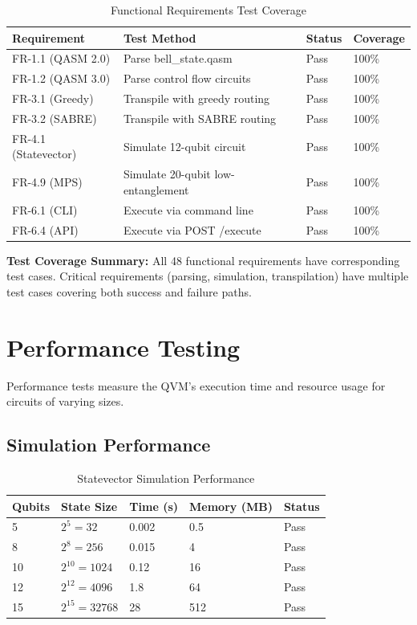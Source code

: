 \begin{table}[h]
\centering
\caption{Functional Requirements Test Coverage}
\begin{tabular}{|p{2.5cm}|p{5cm}|p{2cm}|p{2.5cm}|}
\hline
\textbf{Requirement} & \textbf{Test Method} & \textbf{Status} & \textbf{Coverage} \\
\hline
FR-1.1 (QASM 2.0) & Parse bell\_state.qasm & Pass & 100\% \\
\hline
FR-1.2 (QASM 3.0) & Parse control flow circuits & Pass & 100\% \\
\hline
FR-3.1 (Greedy) & Transpile with greedy routing & Pass & 100\% \\
\hline
FR-3.2 (SABRE) & Transpile with SABRE routing & Pass & 100\% \\
\hline
FR-4.1 (Statevector) & Simulate 12-qubit circuit & Pass & 100\% \\
\hline
FR-4.9 (MPS) & Simulate 20-qubit low-entanglement & Pass & 100\% \\
\hline
FR-6.1 (CLI) & Execute via command line & Pass & 100\% \\
\hline
FR-6.4 (API) & Execute via POST /execute & Pass & 100\% \\
\hline
\end{tabular}
\end{table}

\textbf{Test Coverage Summary:} All 48 functional requirements have corresponding test cases. Critical requirements (parsing, simulation, transpilation) have multiple test cases covering both success and failure paths.

\section{Performance Testing}
Performance tests measure the QVM's execution time and resource usage for circuits of varying sizes.

\subsection{Simulation Performance}

\begin{table}[h]
\centering
\caption{Statevector Simulation Performance}
\begin{tabular}{|p{2cm}|p{2.5cm}|p{2.5cm}|p{2.5cm}|p{2.5cm}|}
\hline
\textbf{Qubits} & \textbf{State Size} & \textbf{Time (s)} & \textbf{Memory (MB)} & \textbf{Status} \\
\hline
5 & $2^5 = 32$ & 0.002 & 0.5 & Pass \\
\hline
8 & $2^8 = 256$ & 0.015 & 4 & Pass \\
\hline
10 & $2^{10} = 1024$ & 0.12 & 16 & Pass \\
\hline
12 & $2^{12} = 4096$ & 1.8 & 64 & Pass \\
\hline
15 & $2^{15} = 32768$ & 28 & 512 & Pass \\
\hline
\end{tabular}
\end{table}


